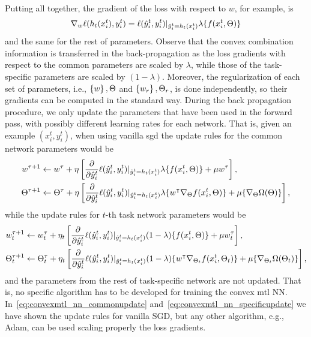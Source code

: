 Putting all together, the gradient of the loss with respect to $w$, for example, is 
$$  \nabla_w \ell(h_t(x_i^t), y_i^t)  =\ell(\hat{y}_i^t, y_i^t) \vert_{\hat{y}_i^t = h_t(x_i^t)} \lambda \lbrace f(x_i^t, \Theta) \rbrace $$
and the same for the rest of parameters.
%
Observe that the convex combination information is transferred in the back-propagation as the loss gradients with respect to the common parameters are scaled by $\lambda$, while those of the task-specific parameters are scaled by $(1 - \lambda)$.
%
Moreover, the regularization of each set of parameters, i.e., $\left\{w\right\}, \Theta$ and $\left\{w_r\right\}, \Theta_r$, is done independently, so their gradients can be computed in the standard way.
%
During the back propagation procedure, we only update the parameters that have been used in the forward pass, with possibly different learning rates for each network. 
That is, given an example $(x_i^t, y_i^t)$, when using vanilla \acrfull{sgd} the update rules for the common network parameters would be
\begin{equation}\label{eq:convexmtl_nn_commonupdate}
    \begin{aligned}
        w^{\tau + 1} &\gets w^\tau + \eta \left[  \frac{\partial}{\partial \hat{y}_i^t}  \lossf(\hat{y}_i^t, y_i^t) \vert_{\hat{y}_i^t = h_t(x_i^t)} \lambda \lbrace f(x_i^t, \Theta) \rbrace + \mu w^\tau \right], \\
        \Theta^{\tau + 1} &\gets \Theta^\tau + \eta \left[ \frac{\partial}{\partial \hat{y}_i^t}  \lossf(\hat{y}_i^t, y_i^t) \vert_{\hat{y}_i^t = h_t(x_i^t)}  \lambda \lbrace w^\intercal \nabla_\Theta f(x_i^t, \Theta)\rbrace + \mu \lbrace \nabla_\Theta \Omega( \Theta)  \rbrace \right],
    \end{aligned}
\end{equation}
while the update rules for $t$-th task network parameters would be
\begin{equation}\label{eq:convexmtl_nn_specificupdate}
    \begin{aligned}
        w_t^{\tau + 1} &\gets w_t^\tau + \eta_t \left[  \frac{\partial}{\partial \hat{y}_i^t}  \lossf(\hat{y}_i^t, y_i^t) \vert_{\hat{y}_i^t = h_t(x_i^t)} (1 - \lambda) \lbrace f(x_i^t, \Theta) \rbrace + \mu w_t^\tau \right], \\
        \Theta_t^{\tau + 1} &\gets \Theta_t^\tau + \eta_t \left[ \frac{\partial}{\partial \hat{y}_i^t}  \lossf(\hat{y}_i^t, y_i^t) \vert_{\hat{y}_i^t = h_t(x_i^t)}  (1 - \lambda) \lbrace w^\intercal \nabla_{\Theta_t} f(x_i^t, \Theta_t)\rbrace + \mu \lbrace \nabla_{\Theta_t} \Omega( \Theta_t) \rbrace \right],
    \end{aligned}
\end{equation}
and the parameters from the rest of task-specific network are not updated.
%
That is, no specific algorithm has to be developed for training the convex \acrshort{mtl} NN. In~\eqref{eq:convexmtl_nn_commonupdate} and~\eqref{eq:convexmtl_nn_specificupdate} we have shown the update rules for vanilla SGD, but any other algorithm, e.g., Adam, can be used scaling properly the loss gradients.


